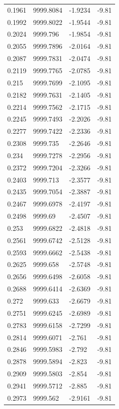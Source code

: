 \begin{table}[H]
\begin{tabular}{llll}
0.1961 & 9999.8084 & -1.9234 & -9.81 \\
0.1992 & 9999.8022 & -1.9544 & -9.81 \\
0.2024 & 9999.796 & -1.9854 & -9.81 \\
0.2055 & 9999.7896 & -2.0164 & -9.81 \\
0.2087 & 9999.7831 & -2.0474 & -9.81 \\
0.2119 & 9999.7765 & -2.0785 & -9.81 \\
0.215 & 9999.7699 & -2.1095 & -9.81 \\
0.2182 & 9999.7631 & -2.1405 & -9.81 \\
0.2214 & 9999.7562 & -2.1715 & -9.81 \\
0.2245 & 9999.7493 & -2.2026 & -9.81 \\
0.2277 & 9999.7422 & -2.2336 & -9.81 \\
0.2308 & 9999.735 & -2.2646 & -9.81 \\
0.234 & 9999.7278 & -2.2956 & -9.81 \\
0.2372 & 9999.7204 & -2.3266 & -9.81 \\
0.2403 & 9999.713 & -2.3577 & -9.81 \\
0.2435 & 9999.7054 & -2.3887 & -9.81 \\
0.2467 & 9999.6978 & -2.4197 & -9.81 \\
0.2498 & 9999.69 & -2.4507 & -9.81 \\
0.253 & 9999.6822 & -2.4818 & -9.81 \\
0.2561 & 9999.6742 & -2.5128 & -9.81 \\
0.2593 & 9999.6662 & -2.5438 & -9.81 \\
0.2625 & 9999.658 & -2.5748 & -9.81 \\
0.2656 & 9999.6498 & -2.6058 & -9.81 \\
0.2688 & 9999.6414 & -2.6369 & -9.81 \\
0.272 & 9999.633 & -2.6679 & -9.81 \\
0.2751 & 9999.6245 & -2.6989 & -9.81 \\
0.2783 & 9999.6158 & -2.7299 & -9.81 \\
0.2814 & 9999.6071 & -2.761 & -9.81 \\
0.2846 & 9999.5983 & -2.792 & -9.81 \\
0.2878 & 9999.5894 & -2.823 & -9.81 \\
0.2909 & 9999.5803 & -2.854 & -9.81 \\
0.2941 & 9999.5712 & -2.885 & -9.81 \\
0.2973 & 9999.562 & -2.9161 & -9.81 \\

\end{tabular}
\end{table}
